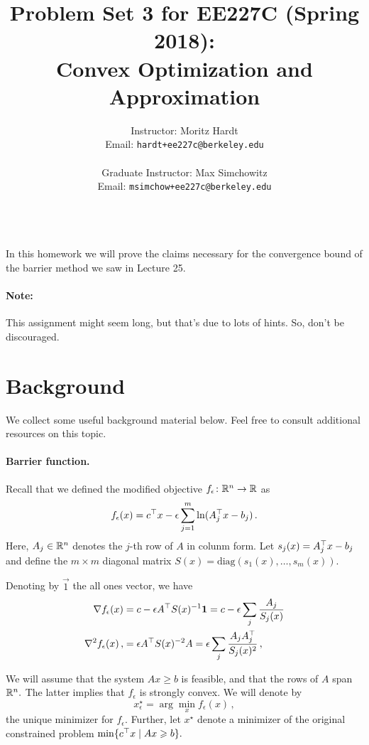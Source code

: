 \documentclass[12pt]{article}
\title{Problem Set 3 for EE227C (Spring 2018):\\
 Convex Optimization and Approximation }
\author{Instructor: Moritz Hardt\\
{\small Email: \tt hardt+ee227c@berkeley.edu}\\ ~\\
Graduate Instructor: Max Simchowitz\\
{\small Email: \tt msimchow+ee227c@berkeley.edu}\\ ~\\
}
\begin{document}



\maketitle

In this homework we will prove the claims necessary for the convergence bound of
the barrier method we saw in Lecture 25.

\paragraph{Note:} This assignment might seem long, but that's due to lots of
hints. So, don't be discouraged.

\section*{Background}

We collect some useful background material below. Feel free to consult
additional resources on this topic.

\paragraph{Barrier function.}
Recall that we defined the modified objective $f_\epsilon\colon\mathbb{R}^n\to\mathbb{R}$ as
\[
f_\epsilon(x) = c^\top x - \epsilon\sum_{j=1}^m \ln(A_j^\top x - b_j)\,.
\]
Here, $A_j\in\mathbb{R}^n$ denotes the $j$-th row of $A$ in colunm form.
Let $s_j(x)= A_j^\top x-b_j$ and define the $m\times m$ diagonal matrix
$S(x)=\mathrm{diag}(s_1(x),\dots,s_m(x)).$

Denoting by $\vec{1}$ the all ones vector, we have
\begin{align*}
\nabla f_\epsilon(x) 
&= c - \epsilon A^\top S(x)^{-1}{\bm{1}}
= c - \epsilon\sum_j \frac{A_j}{S_j(x)}\\
\nabla^2 f_\epsilon(x) \,,
& = \epsilon A^\top S(x)^{-2} A
= \epsilon \sum_j \frac{A_jA_j^\top}{S_j(x)^2}\,,
\end{align*}

We will assume that the system $Ax\ge b$ is feasible, and that the rows of $A$
span~$\mathbb{R}^n.$ The latter implies that $f_\epsilon$ is strongly convex. We will denote
by
\[
x_\epsilon^\star=\arg\min_x f_\epsilon(x)\,,
\]
the unique minimizer for $f_\epsilon.$ Further, let $x^\star$ denote a minimizer
of the original constrained problem $\min\{c^\top x\mid Ax\geqslant b\}.$
\end{document}
